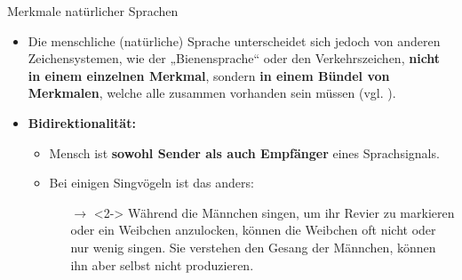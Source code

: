\begin{frame}{Merkmale natürlicher Sprachen}

\begin{itemize}
	\item Die menschliche (natürliche) Sprache unterscheidet sich jedoch von anderen Zeichensystemen, wie der „Bienensprache“ oder den Verkehrszeichen, \textbf{nicht in einem einzelnen Merkmal}, sondern \textbf{in einem Bündel von Merkmalen}, welche alle zusammen vorhanden sein müssen (vgl. \citet{Hockett60a}).
\end{itemize}

\end{frame}




\begin{frame}

\begin{itemize}
	\item<1-> \textbf{Bidirektionalität:}

	\begin{itemize}
		\item[]
		\item<1-> Mensch ist \textbf{sowohl Sender als auch Empfänger} eines Sprachsignals.
		\item[]
		\item<2-> Bei einigen Singvögeln ist das anders:
		
		\begin{itemize}
			\item[]
			\item[$\rightarrow$]<2-> Während die Männchen singen, um ihr Revier zu markieren oder ein Weibchen anzulocken, können die Weibchen oft nicht oder nur wenig singen. Sie verstehen den Gesang der Männchen, können ihn aber selbst nicht produzieren.
		\end{itemize}
			
	\end{itemize}

\end{itemize}

\end{frame}



